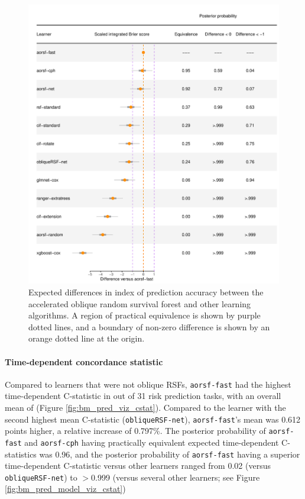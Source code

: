 \documentclass[twoside,11pt]{article}\usepackage[]{graphicx}\usepackage[]{xcolor}
\makeatletter
\def\maxwidth{ %
  \ifdim\Gin@nat@width>\linewidth
    \linewidth
  \else
    \Gin@nat@width
  \fi
}
\newenvironment{knitrout}{}{} %
\makeatother
\begin{document}
\begin{knitrout}
\color{fgcolor}\begin{figure}
\includegraphics[width=\maxwidth]{figure/bm_pred_model_viz_ibs-1} \caption[Expected differences in index of prediction accuracy between the accelerated oblique random survival forest and other learning algorithms]{Expected differences in index of prediction accuracy between the accelerated oblique random survival forest and other learning algorithms. A region of practical equivalence is shown by purple dotted lines, and a boundary of non-zero difference is shown by an orange dotted line at the origin.}\label{fig:bm_pred_model_viz_ibs}
\end{figure}

\end{knitrout}

\paragraph{Time-dependent concordance statistic}




Compared to learners that were not oblique RSFs, \texttt{aorsf-fast} had the highest time-dependent C-statistic in  out of 31 risk prediction tasks, with an overall mean of  (Figure \ref{fig:bm_pred_viz_cstat}). Compared to the learner with the second highest mean C-statistic (\texttt{obliqueRSF-net}), \texttt{aorsf-fast}'s mean was 0.612 points higher, a relative increase of 0.797\%. The posterior probability of \texttt{aorsf-fast} and \texttt{aorsf-cph} having practically equivalent expected time-dependent C-statistics was 0.96, and the posterior probability of \texttt{aorsf-fast} having a superior time-dependent C-statistic versus other learners ranged from 0.02 (versus \texttt{obliqueRSF-net}) to $>$0.999 (versus several other learners; see Figure \ref{fig:bm_pred_model_viz_cstat})
\end{document}
